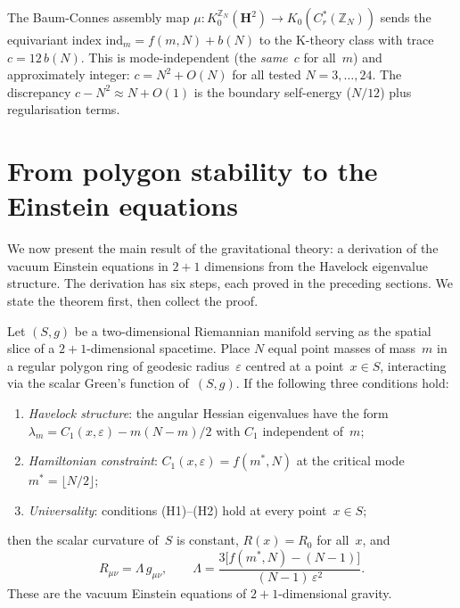 The Baum-Connes assembly map $\mu\colon K_0^{\mathbb{Z}_N}(\mathbf{H}^2)
\to K_0(C^*_r(\mathbb{Z}_N))$ sends the equivariant index
$\mathrm{ind}_m = f(m,N) + b(N)$ to the K-theory class with trace
$c = 12\,b(N)$.  This is mode-independent (the \emph{same}~$c$ for
all~$m$) and approximately integer: $c = N^2 + O(N)$ for all tested
$N = 3,\ldots,24$.  The discrepancy $c - N^2 \approx N + O(1)$
is the boundary self-energy ($N/12$) plus regularisation terms.

\section{From polygon stability to the Einstein equations}
\label{sec:lichnerowicz}

We now present the main result of the gravitational theory:
a derivation of the vacuum Einstein equations in $2{+}1$
dimensions from the Havelock eigenvalue structure.
The derivation has six steps, each proved in the preceding sections.
We state the theorem first, then collect the proof.

\begin{theorem}
\label{thm:polygon-einstein}
Let $(S, g)$ be a two-dimensional Riemannian manifold serving
as the spatial slice of a $2{+}1$-dimensional spacetime.
Place $N$ equal point masses of mass~$m$ in a regular polygon ring
of geodesic radius~$\varepsilon$ centred at a point~$x \in S$,
interacting via the scalar Green's function of~$(S, g)$.
If the following three conditions hold:
\begin{enumerate}
\item[\textup{(H1)}]
  \emph{Havelock structure}: the angular Hessian eigenvalues
  have the form $\lambda_m = C_1(x,\varepsilon) - m(N{-}m)/2$
  with $C_1$ independent of~$m$;
\item[\textup{(H2)}]
  \emph{Hamiltonian constraint}: $C_1(x,\varepsilon) = f(m^*,N)$
  at the critical mode $m^* = \lfloor N/2\rfloor$;
\item[\textup{(H3)}]
  \emph{Universality}: conditions \textup{(H1)--(H2)} hold
  at every point~$x \in S$;
\end{enumerate}
then the scalar curvature of~$S$ is constant,
$R(x) = R_0$ for all~$x$, and
\begin{equation}\label{eq:einstein-from-polygon}
  R_{\mu\nu} = \Lambda\,g_{\mu\nu},
  \qquad
  \Lambda = \frac{3\bigl[f(m^*,N) - (N{-}1)\bigr]}
                 {(N{-}1)\,\varepsilon^2}.
\end{equation}
These are the vacuum Einstein equations of $2{+}1$-dimensional
gravity.
\end{theorem}

